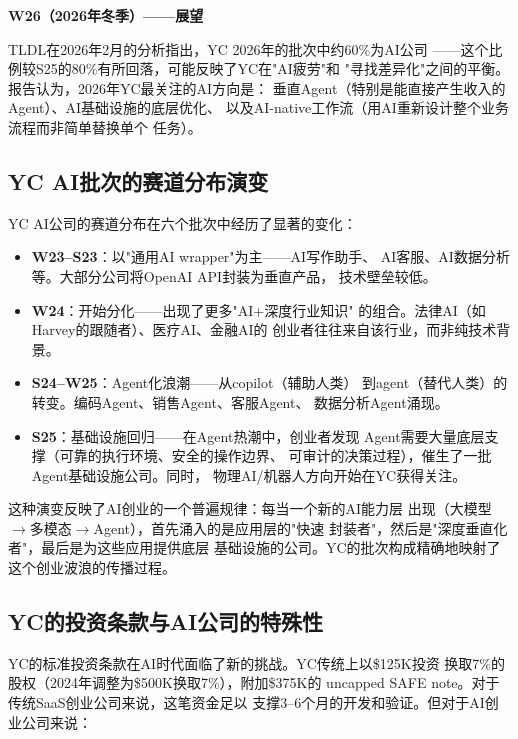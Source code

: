 \textbf{W26（2026年冬季）——展望}

TLDL在2026年2月的分析指出，YC 2026年的批次中约60\%为AI公司
——这个比例较S25的80\%有所回落，可能反映了YC在"AI疲劳"和
"寻找差异化"之间的平衡。报告认为，2026年YC最关注的AI方向是：
垂直Agent（特别是能直接产生收入的Agent）、AI基础设施的底层优化、
以及AI-native工作流（用AI重新设计整个业务流程而非简单替换单个
任务）。

\subsection{YC AI批次的赛道分布演变}
\label{subsec:fund-yc-sectors}

YC AI公司的赛道分布在六个批次中经历了显著的变化：

\begin{itemize}
  \item \textbf{W23--S23}：以"通用AI wrapper"为主——AI写作助手、
    AI客服、AI数据分析等。大部分公司将OpenAI API封装为垂直产品，
    技术壁垒较低。
  \item \textbf{W24}：开始分化——出现了更多"AI+深度行业知识"
    的组合。法律AI（如Harvey的跟随者）、医疗AI、金融AI的
    创业者往往来自该行业，而非纯技术背景。
  \item \textbf{S24--W25}：Agent化浪潮——从copilot（辅助人类）
    到agent（替代人类）的转变。编码Agent、销售Agent、客服Agent、
    数据分析Agent涌现。
  \item \textbf{S25}：基础设施回归——在Agent热潮中，创业者发现
    Agent需要大量底层支撑（可靠的执行环境、安全的操作边界、
    可审计的决策过程），催生了一批Agent基础设施公司。同时，
    物理AI/机器人方向开始在YC获得关注。
\end{itemize}

这种演变反映了AI创业的一个普遍规律：每当一个新的AI能力层
出现（大模型$\to$多模态$\to$Agent），首先涌入的是应用层的"快速
封装者"，然后是"深度垂直化者"，最后是为这些应用提供底层
基础设施的公司。YC的批次构成精确地映射了这个创业波浪的传播过程。

\subsection{YC的投资条款与AI公司的特殊性}
\label{subsec:fund-yc-terms}

YC的标准投资条款在AI时代面临了新的挑战。YC传统上以\$125K投资
换取7\%的股权（2024年调整为\$500K换取7\%），附加\$375K的
uncapped SAFE note。对于传统SaaS创业公司来说，这笔资金足以
支撑3--6个月的开发和验证。但对于AI创业公司来说：

